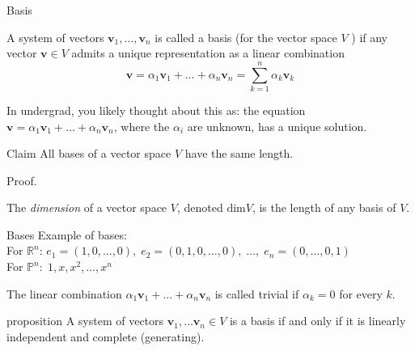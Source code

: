 \documentclass [aspectratio=169]{beamer}
\newcommand{\bv}{{\mathbf{v}}}
\newcommand{\R}{{\mathbb{R}}}
\begin{document}
\begin{frame}{Basis}
\begin{definition}
A system of vectors $\bv_1, \ldots, \bv_n$ is called a basis (for the vector space $V$ ) if any vector $\bv \in V$ admits a unique representation as a linear combination
$$
\bv = \alpha_1 \bv_1 + \ldots + \alpha_n \bv_n = \sum_{k=1}^n \alpha_k \bv_k
$$
\end{definition}

In undergrad, you likely thought about this as: the equation $\bv = \alpha_1 \bv_1 + \ldots + \alpha_n \bv_n$, where the $\alpha_i$ are unknown, has a unique solution.
\end{frame}

\begin{frame}


\begin{exampleblock}{Claim}
All bases of a vector space $V$ have the same length.
\end{exampleblock}

Proof.

\vspace{4cm}

\begin{definition}
The \emph{dimension} of a vector space $V$, denoted $\text{dim} V$, is the length of any basis of $V$.
\end{definition}


\end{frame}

\begin{frame}{Bases}
Example of bases: \\
For $\R^n$: $e_1 = (1,0,\ldots, 0), \; e_2 = (0,1,0,\ldots,0), \; \ldots, \; e_n = (0, \ldots, 0, 1)$ \\
For $\mathbb{P}^n: \; 1, x, x^2, \ldots, x^n$

\begin{definition}
The linear combination $\alpha_{1}\bv_{1}+...+\alpha_{n}\bv_{n}$ is called trivial if $\alpha_k = 0$ for every $k$.
\end{definition}

\begin{block}{proposition}
 A system of vectors $\bv_1, \ldots \bv_n \in V$ is a basis if and only if it is linearly independent and complete (generating).
\end{block}

\end{frame}
\end{document}
